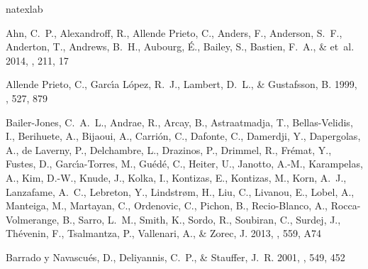 \documentclass[12pt, preprint]{aastex}
\begin{document}
\begin{thebibliography}{24}
\expandafter\ifx\csname natexlab\endcsname\relax\def\natexlab#1{#1}\fi

{Ahn}, C.~P., {Alexandroff}, R., {Allende Prieto}, C., {Anders}, F.,
  {Anderson}, S.~F., {Anderton}, T., {Andrews}, B.~H., {Aubourg}, {\'E}.,
  {Bailey}, S., {Bastien}, F.~A., \& et~al. 2014, \apjs, 211, 17

{Allende Prieto}, C., {Garc{\'{\i}}a L{\'o}pez}, R.~J., {Lambert}, D.~L., \&
  {Gustafsson}, B. 1999, \apj, 527, 879
  
{Bailer-Jones}, C.~A.~L., {Andrae}, R., {Arcay}, B., {Astraatmadja}, T.,
  {Bellas-Velidis}, I., {Berihuete}, A., {Bijaoui}, A., {Carri{\'o}n}, C.,
  {Dafonte}, C., {Damerdji}, Y., {Dapergolas}, A., {de Laverny}, P.,
  {Delchambre}, L., {Drazinos}, P., {Drimmel}, R., {Fr{\'e}mat}, Y., {Fustes},
  D., {Garc{\'{\i}}a-Torres}, M., {Gu{\'e}d{\'e}}, C., {Heiter}, U., {Janotto},
  A.-M., {Karampelas}, A., {Kim}, D.-W., {Knude}, J., {Kolka}, I., {Kontizas},
  E., {Kontizas}, M., {Korn}, A.~J., {Lanzafame}, A.~C., {Lebreton}, Y.,
  {Lindstr{\o}m}, H., {Liu}, C., {Livanou}, E., {Lobel}, A., {Manteiga}, M.,
  {Martayan}, C., {Ordenovic}, C., {Pichon}, B., {Recio-Blanco}, A.,
  {Rocca-Volmerange}, B., {Sarro}, L.~M., {Smith}, K., {Sordo}, R., {Soubiran},
  C., {Surdej}, J., {Th{\'e}venin}, F., {Tsalmantza}, P., {Vallenari}, A., \&
  {Zorec}, J. 2013, \aap, 559, A74

{Barrado y Navascu{\'e}s}, D., {Deliyannis}, C.~P., \& {Stauffer}, J.~R. 2001,
  \apj, 549, 452


\end{thebibliography}
\end{document}

